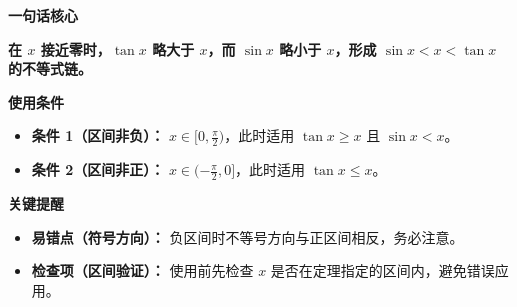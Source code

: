 \begin{summarybox}
\textbf{\textcolor{CSummary}{一句话核心}}

\textbf{在 $x$ 接近零时，$\tan x$ 略大于 $x$，而 $\sin x$ 略小于 $x$，形成 $\sin x < x < \tan x$ 的不等式链。}

\medskip
\textbf{\textcolor{CSummary}{使用条件}}
\begin{itemize}[leftmargin=*, itemsep=0.5em, topsep=0.4em]
    \item \textbf{条件 1（区间非负）：} $x \in [0, \frac{\pi}{2})$，此时适用 $\tan x \geq x$ 且 $\sin x < x$。
    \item \textbf{条件 2（区间非正）：} $x \in (-\frac{\pi}{2}, 0]$，此时适用 $\tan x \leq x$。
\end{itemize}

\medskip
\textbf{\textcolor{CSummary}{关键提醒}}
\begin{itemize}[leftmargin=*, itemsep=0.5em, topsep=0.4em]
    \item \textbf{易错点（符号方向）：} 负区间时不等号方向与正区间相反，务必注意。
    \item \textbf{检查项（区间验证）：} 使用前先检查 $x$ 是否在定理指定的区间内，避免错误应用。
\end{itemize}
\end{summarybox}
